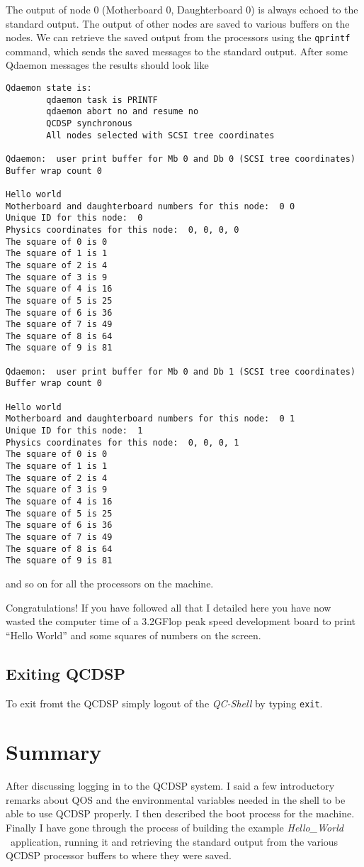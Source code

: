 The output of node 0 (Motherboard 0, Daughterboard 0) is always
echoed to the standard output. The output of other nodes are 
saved to various buffers on the nodes. We can retrieve the saved
output from the processors using the {\tt qprintf} command, which
sends the saved messages to the standard output. After some Qdaemon
messages the results should look like
\begin{verbatim}
Qdaemon state is:
        qdaemon task is PRINTF
        qdaemon abort no and resume no
        QCDSP synchronous
        All nodes selected with SCSI tree coordinates

Qdaemon:  user print buffer for Mb 0 and Db 0 (SCSI tree coordinates)
Buffer wrap count 0

Hello world
Motherboard and daughterboard numbers for this node:  0 0
Unique ID for this node:  0
Physics coordinates for this node:  0, 0, 0, 0
The square of 0 is 0
The square of 1 is 1
The square of 2 is 4
The square of 3 is 9
The square of 4 is 16
The square of 5 is 25
The square of 6 is 36
The square of 7 is 49
The square of 8 is 64
The square of 9 is 81

Qdaemon:  user print buffer for Mb 0 and Db 1 (SCSI tree coordinates)
Buffer wrap count 0

Hello world
Motherboard and daughterboard numbers for this node:  0 1
Unique ID for this node:  1
Physics coordinates for this node:  0, 0, 0, 1
The square of 0 is 0
The square of 1 is 1
The square of 2 is 4
The square of 3 is 9
The square of 4 is 16
The square of 5 is 25
The square of 6 is 36
The square of 7 is 49
The square of 8 is 64
The square of 9 is 81
\end{verbatim} 
and so on for all the processors on the machine.

Congratulations! If you have followed all that I detailed here you
have now wasted the computer time of a 3.2GFlop peak speed development
board to print ``Hello World'' and some squares of numbers on the screen.

\subsection{Exiting QCDSP}
To exit fromt the QCDSP simply logout of the {\em QC-Shell} by typing
{\tt exit}.

\section{Summary}
After discussing logging in to the QCDSP system. I said a few introductory
remarks about QOS and the environmental variables needed in the shell
to be able to use QCDSP properly. I then described the boot process for the
machine. Finally I have gone through the process of building the example
{\em Hello\_World} \ application, running it and retrieving the standard
output from the various QCDSP processor buffers to where they were saved.

